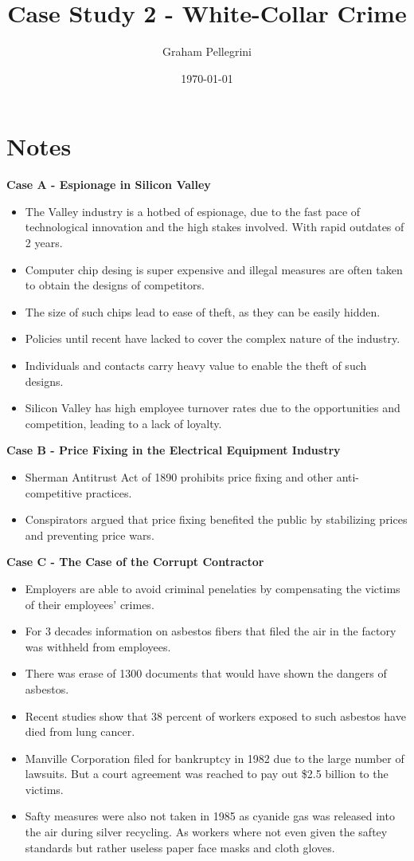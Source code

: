 \documentclass{article}
\title{Case Study 2 - White-Collar Crime}
\author{Graham Pellegrini}
\date{\today}
\begin{document}
\maketitle

\section*{Notes}
\textbf{Case A - Espionage in Silicon Valley}
\begin{itemize}
    \item The Valley industry is a hotbed of espionage, due to the fast pace of technological innovation and the high stakes involved. With rapid outdates of 2 years.
    \item Computer chip desing is super expensive and illegal measures are often taken to obtain the designs of competitors.
    \item The size of such chips lead to ease of theft, as they can be easily hidden.
    \item Policies until recent have lacked to cover the complex nature of the industry.
    \item Individuals and contacts carry heavy value to enable the theft of such designs.
    \item Silicon Valley has high employee turnover rates due to the opportunities and competition, leading to a lack of loyalty.
\end{itemize}

\textbf{Case B - Price Fixing in the Electrical Equipment Industry}
\begin{itemize}
    \item Sherman Antitrust Act of 1890 prohibits price fixing and other anti-competitive practices.
    \item Conspirators argued that price fixing benefited the public by stabilizing prices and preventing price wars.
\end{itemize}

\textbf{Case C - The Case of the Corrupt Contractor}
\begin{itemize}
    \item Employers are able to avoid criminal penelaties by compensating the victims of their employees' crimes.
    \item For 3 decades information on asbestos fibers that filed the air in the factory was withheld from employees.
    \item There was erase of 1300 documents that would have shown the dangers of asbestos.
    \item Recent studies show that 38 percent of workers exposed to such asbestos have died from lung cancer.
    \item Manville Corporation filed for bankruptcy in 1982 due to the large number of lawsuits. But a court agreement was reached to pay out \$2.5 billion to the victims.
    \item Safty measures were also not taken in 1985 as cyanide gas was released into the air during silver recycling. As workers where not even given the saftey standards but rather useless paper face masks and cloth gloves.
\end{itemize}
\end{document}
